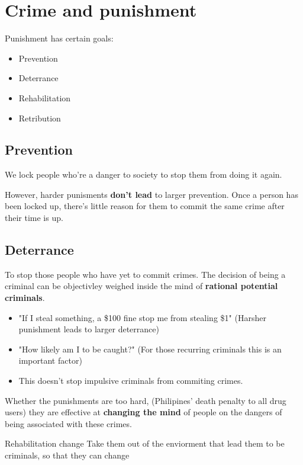 
\section{Crime and punishment} 

Punishment has certain goals:
\begin{itemize}
	\item Prevention
	\item Deterrance
	\item Rehabilitation
	\item Retribution
\end{itemize}

\subsection{Prevention} 
We lock people who're a danger to society to stop them from doing it again.

However, harder punisments \textbf{don't lead} to larger prevention. Once a person has been locked up, there's little reason for them to commit the same crime after their time is up.


\subsection{Deterrance} 
To stop those people who have yet to commit crimes. The decision of being a criminal can be objectivley weighed inside the mind of \textbf{rational potential criminals}.

\begin{itemize}
	\item "If I steal something, a \$100 fine stop me from stealing \$1"
	\subitem (Harsher punishment leads to larger deterrance)
	\item "How likely am I to be caught?"
	\subitem (For those recurring criminals this is an important factor)
	\item This doesn't stop impulsive criminals from commiting crimes.
\end{itemize}

Whether the punishments are too hard,  (Philipines' death penalty to all drug users) they are effective at \textbf{changing the mind} of people on the dangers of being associated with these crimes.

				
					
	
		Rehabilitation
			change
				Take them out of the enviorment that lead them to be criminals, so that they can change

